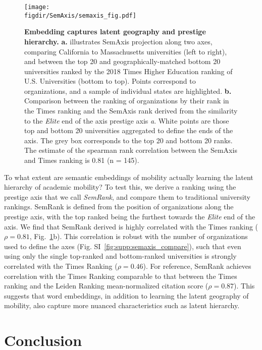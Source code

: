 \documentclass[12pt]{article} %
\def\figdir{../Figs}
\begin{document}
%
%
\begin{figure}[hp!]
	\centering
	\label{fig:semaxis}
	\texttt{[image: \\figdir/SemAxis/semaxis\_fig.pdf]}
	\caption{
		\textbf{Embedding captures latent geography and prestige hierarchy.}
		\textbf{a.} illustrates SemAxis projection along two axes, comparing California to Massachusetts universities (left to right), and between the top 20 and geographically-matched bottom 20 universities ranked by the 2018 Times Higher Education ranking of U.S. Universities (bottom to top). 
		Points correspond to organizations, and a sample of individual states are highlighted. 
		\textbf{b.} Comparison between the ranking of organizations by their rank in the Times ranking and the SemAxis rank derived from the similarity to the \textit{Elite} end of the axis prestige axis \textit{a}.
		White points are those top and bottom 20 universities aggregated to define the ends of the axis. 
		The grey box corresponds to the top 20 and bottom 20 ranks. 
	  	The estimate of the spearman rank correlation between the SemAxis and Times ranking is 0.81 (n = 145).
	}
\end{figure}

To what extent are semantic embeddings of mobility actually learning the latent hierarchy of academic mobility?
To test this, we derive a ranking using the prestige axis that we call \textit{SemRank}, and compare them to traditional university rankings. 
SemRank is defined from the position of organizations along the prestige axis, with the top ranked being the furthest towards the \textit{Elite} end of the axis.
We find that SemRank derived is highly correlated with the Times ranking ($\rho = 0.81$, Fig.~\ref{fig:semaxis}b). 
This correlation is robust with the number of organizations used to define the axes (Fig. SI~\ref{fig:supp:semaxis_compare}), such that even using only the single top-ranked and bottom-ranked universities is strongly correlated with the Times Ranking ($\rho = 0.46$). 
For reference, SemRank achieves correlation with the Times Ranking comparable to that between the Times ranking and the Leiden Ranking mean-normalized citation score ($\rho = 0.87$). 
This suggests that word embeddings, in addition to learning the latent geography of mobility, also capture more nuanced characteristics such as latent hierarchy. 




%
% 
\section*{Conclusion}
\end{document}
